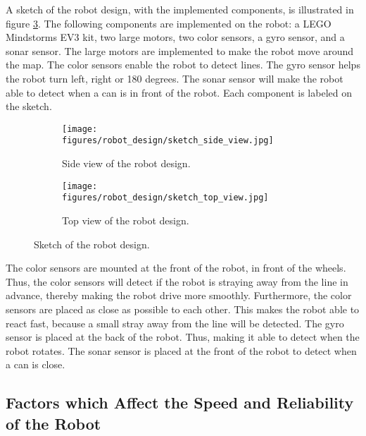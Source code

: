 \documentclass[../report.tex]{subfiles}
\begin{document}
A sketch of the robot design, with the implemented components, is illustrated in figure \ref{fig:robot_design_sketch}. The following components are implemented on the robot: a LEGO Mindstorms EV3 kit, two large motors, two color sensors, a gyro sensor, and a sonar sensor. The large motors are implemented to make the robot move around the map. The color sensors enable the robot to detect lines. The gyro sensor helps the robot turn left, right or 180 degrees. The sonar sensor will make the robot able to detect when a can is in front of the robot. Each component is labeled on the sketch.

\begin{figure}[H]
    \centering
    \begin{subfigure}[b]{0.5\textwidth}
        \centering
        \texttt{[image: figures/robot\_design/sketch\_side\_view.jpg]}
        \caption{Side view of the robot design.}
        \label{fig:sketch_side_view}
    \end{subfigure}%
    \begin{subfigure}[b]{0.5\textwidth}
        \centering
        \texttt{[image: figures/robot\_design/sketch\_top\_view.jpg]}
        \caption{Top view of the robot design.}
        \label{fig:sketch_top_view}
    \end{subfigure}
    \caption{Sketch of the robot design.}
    \label{fig:robot_design_sketch}
\end{figure}

The color sensors are mounted at the front of the robot, in front of the wheels. Thus, the color sensors will detect if the robot is straying away from the line in advance, thereby making the robot drive more smoothly. Furthermore, the color sensors are placed as close as possible to each other. This makes the robot able to react fast, because a small stray away from the line will be detected. The gyro sensor is placed at the back of the robot. Thus, making it able to detect when the robot rotates. The sonar sensor is placed at the front of the robot to detect when a can is close.

\subsection*{Factors which Affect the Speed and Reliability of the Robot}
\end{document}
